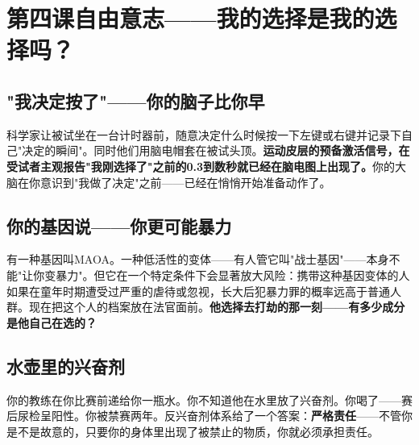 \documentclass[a4paper,12pt]{ctexart}
\begin{document}
\newpage
\section{\textcolor{orange!80!black}{第四课\quad 自由意志——我的选择是我的选择吗？}}

\subsection*{"我决定按了"——你的脑子比你早}

科学家让被试坐在一台计时器前，随意决定什么时候按一下左键或右键并记录下自己"决定的瞬间"。同时他们用脑电帽套在被试头顶。\textbf{运动皮层的预备激活信号，在受试者主观报告"我刚选择了"之前的0.3到数秒就已经在脑电图上出现了。}你的大脑在你意识到"我做了决定"之前——已经在悄悄开始准备动作了。

\subsection*{你的基因说——你更可能暴力}

有一种基因叫MAOA。一种低活性的变体——有人管它叫"战士基因"——本身不能"让你变暴力"。但它在一个特定条件下会显著放大风险：携带这种基因变体的人如果在童年时期遭受过严重的虐待或忽视，长大后犯暴力罪的概率远高于普通人群。现在把这个人的档案放在法官面前。\textbf{他选择去打劫的那一刻——有多少成分是他自己在选的？}

\subsection*{水壶里的兴奋剂}

你的教练在你比赛前递给你一瓶水。你不知道他在水里放了兴奋剂。你喝了——赛后尿检呈阳性。你被禁赛两年。反兴奋剂体系给了一个答案：\textbf{严格责任}——不管你是不是故意的，只要你的身体里出现了被禁止的物质，你就必须承担责任。

\end{document}
